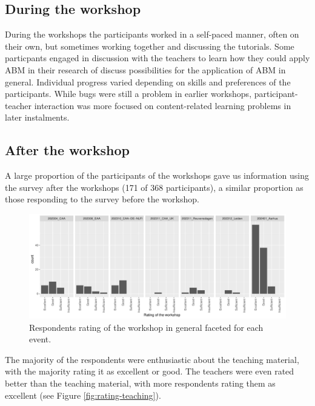 \documentclass[
]{article}
\begin{document}
\hypertarget{during-the-workshop}{%
\subsection{During the workshop}\label{during-the-workshop}}

During the workshops the participants worked in a self-paced manner, often on their own, but sometimes working together and discussing the tutorials. Some particpants engaged in discussion with the teachers to learn how they could apply ABM in their research of discuss possibilities for the application of ABM in general. Individual progress varied depending on skills and preferences of the participants. While bugs were still a problem in earlier workshops, participant-teacher interaction was more focused on content-related learning problems in later instalments.

\hypertarget{after-the-workshop}{%
\subsection{After the workshop}\label{after-the-workshop}}

A large proportion of the participants of the workshops gave us information using the survey after the workshops (171 of 368 participants), a similar proportion as those responding to the survey before the workshop.

\begin{figure}
\centering
\includegraphics{paper_files/figure-latex/rating-workshop-1.pdf}
\caption{\label{fig:rating-workshop}Respondents rating of the workshop in general faceted for each event.}
\end{figure}

The majority of the respondents were enthusiastic about the teaching material, with the majority rating it as excellent or good. The teachers were even rated better than the teaching material, with more respondents rating them as excellent (see Figure \ref{fig:rating-teaching}).
\end{document}
